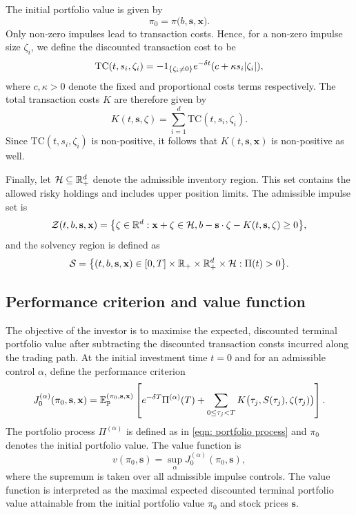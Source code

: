 The initial portfolio value is given by
\begin{equation}
    \pi_0 = \pi \big(b, \mathbf{s}, \mathbf{x}\big). 
    \label{eqn: initial portfolio function}
\end{equation}
Only non-zero impulses lead to transaction costs. Hence, for a non-zero impulse size $\zeta_i$, we define the discounted transaction cost to be
\begin{equation*}
    \text{TC}(t,s_i,\zeta_i) = -1_{\left\{\zeta_i\neq0\right\}} e^{-\delta t}(c + \kappa s_i |\zeta_i|),
\end{equation*}
where $c,\kappa>0$ denote the fixed and proportional costs terms respectively. The total transaction costs $K$ are therefore given by 
\begin{equation*}
    K(t,\mathbf{s}, \zeta) = \sum_{i=1}^d \text{TC}(t,s_i,\zeta_i).
\end{equation*}
Since $\text{TC}(t,s_i,\zeta_i)$ is non-positive, it follows that $K(t,\mathbf{s}, \mathbf x)$ is non-positive as well. 

Finally, let $\mathcal H \subseteq \mathbb{R}_+^d$ denote the admissible inventory region. This set contains the allowed risky holdings and includes upper position limits. The admissible impulse set is 
\begin{equation}
    \mathcal{Z}(t, b, \mathbf s, \mathbf x) = \big\{ \zeta \in \mathbb{R}^d: \mathbf{x} + \zeta \in \mathcal H, b - \mathbf{s}\cdot\zeta - K(t,\mathbf s, \zeta) \geq 0 \big\},
\end{equation}
and the solvency region is defined as
\begin{equation*}
    \mathcal{S} = \big\{ (t,b,\mathbf s, \mathbf x) \in [0,T] \times \mathbb{R}_+ \times \mathbb{R}_+^d \times \mathcal H: \Pi(t)>0 \big\}. 
\end{equation*}

\subsection{Performance criterion and value function}
The objective of the investor is to maximise the expected, discounted terminal portfolio value after subtracting the discounted transaction consts incurred along the trading path. At the initial investment time $t=0$ and for an admissible control $\alpha$, define the performance criterion
\begin{equation}
    J_0^{(\alpha)}(\pi_0, \mathbf s, \mathbf x) = \mathbb{E}_{\mathbb{P}}^{(\pi_0, \mathbf s, \mathbf x)} \left[e^{-\delta T} \Pi^{(\alpha)}(T) + \sum_{0 \leq \tau_j < T} K\big(\tau_j, S(\tau_j), \zeta(\tau_j)\big) \right]. 
    \label{eqn: performance criterion continuous time portfolio example}
\end{equation}
The portfolio process $\Pi^{(\alpha)}$ is defined as in \eqref{eqn: portfolio process} and $\pi_0$ denotes the initial portfolio value. The value function is 
\begin{equation*}
    v(\pi_0, \mathbf{s}) = \sup_\alpha J_0^{(\alpha)}(\pi_0, \mathbf s),
\end{equation*}
where the supremum is taken over all admissible impulse controls. The value function is interpreted as the maximal expected discounted terminal portfolio value attainable from the initial portfolio value $\pi_0$ and stock prices $\mathbf s$. 

